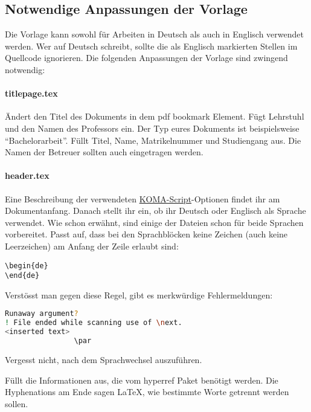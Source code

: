 \subsection{Notwendige Anpassungen der Vorlage}
%
Die Vorlage kann sowohl für Arbeiten in Deutsch als auch in Englisch verwendet
werden.
Wer auf Deutsch schreibt, sollte die als Englisch markierten Stellen im Quellcode
ignorieren.
Die folgenden Anpassungen der Vorlage sind zwingend notwendig:
%
\paragraph{titlepage.tex}
%
Ändert den Titel des Dokuments in dem pdf bookmark Element.
Fügt Lehrstuhl und den Namen des Professors ein.
Der Typ eures Dokuments ist beispielsweise ``Bachelorarbeit''.
Füllt Titel, Name, Matrikelnummer und Studiengang aus.
Die Namen der Betreuer sollten auch eingetragen werden.
%
\paragraph{header.tex}
%

Eine Beschreibung der verwendeten 
\href{http://www.komascript.de/}{KOMA-Script}-Optionen findet ihr am
Dokumentanfang. 
Danach stellt ihr ein, ob ihr Deutsch oder Englisch als Sprache verwendet.
Wie schon erwähnt, sind einige der Dateien schon für beide Sprachen 
vorbereitet.
Passt auf, dass bei den Sprachblöcken keine Zeichen (auch keine Leerzeichen)
am Anfang der Zeile erlaubt sind:
\begin{lstlisting}[language={[LaTeX]TeX}]
\begin{de}
\end{de}
\end{lstlisting}
Verstösst man gegen diese Regel, gibt es merkwürdige Fehlermeldungen:
\begin{lstlisting}[language=bash]
Runaway argument?
! File ended while scanning use of \next.
<inserted text> 
                \par
\end{lstlisting}
Vergesst nicht,  nach dem Sprachwechsel auszuführen.

Füllt die Informationen aus, die vom hyperref Paket benötigt werden.
Die Hyphenations am Ende sagen {\LaTeX}, wie bestimmte Worte getrennt werden sollen.
%
